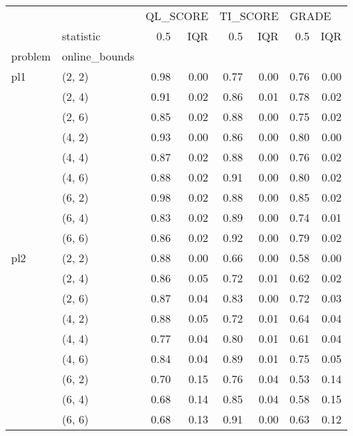 \begin{tabular}{llrrrrrr}
\toprule
    & {} & \multicolumn{2}{l}{QL\_SCORE} & \multicolumn{2}{l}{TI\_SCORE} & \multicolumn{2}{l}{GRADE} \\
    & statistic &      0.5 &  IQR &      0.5 &  IQR &   0.5 &  IQR \\
problem & online\_bounds &          &      &          &      &       &      \\
\midrule
pl1 & (2, 2) &     0.98 & 0.00 &     0.77 & 0.00 &  0.76 & 0.00 \\
    & (2, 4) &     0.91 & 0.02 &     0.86 & 0.01 &  0.78 & 0.02 \\
    & (2, 6) &     0.85 & 0.02 &     0.88 & 0.00 &  0.75 & 0.02 \\
    & (4, 2) &     0.93 & 0.00 &     0.86 & 0.00 &  0.80 & 0.00 \\
    & (4, 4) &     0.87 & 0.02 &     0.88 & 0.00 &  0.76 & 0.02 \\
    & (4, 6) &     0.88 & 0.02 &     0.91 & 0.00 &  0.80 & 0.02 \\
    & (6, 2) &     0.98 & 0.02 &     0.88 & 0.00 &  0.85 & 0.02 \\
    & (6, 4) &     0.83 & 0.02 &     0.89 & 0.00 &  0.74 & 0.01 \\
    & (6, 6) &     0.86 & 0.02 &     0.92 & 0.00 &  0.79 & 0.02 \\
pl2 & (2, 2) &     0.88 & 0.00 &     0.66 & 0.00 &  0.58 & 0.00 \\
    & (2, 4) &     0.86 & 0.05 &     0.72 & 0.01 &  0.62 & 0.02 \\
    & (2, 6) &     0.87 & 0.04 &     0.83 & 0.00 &  0.72 & 0.03 \\
    & (4, 2) &     0.88 & 0.05 &     0.72 & 0.01 &  0.64 & 0.04 \\
    & (4, 4) &     0.77 & 0.04 &     0.80 & 0.01 &  0.61 & 0.04 \\
    & (4, 6) &     0.84 & 0.04 &     0.89 & 0.01 &  0.75 & 0.05 \\
    & (6, 2) &     0.70 & 0.15 &     0.76 & 0.04 &  0.53 & 0.14 \\
    & (6, 4) &     0.68 & 0.14 &     0.85 & 0.04 &  0.58 & 0.15 \\
    & (6, 6) &     0.68 & 0.13 &     0.91 & 0.00 &  0.63 & 0.12 \\
\bottomrule
\end{tabular}
